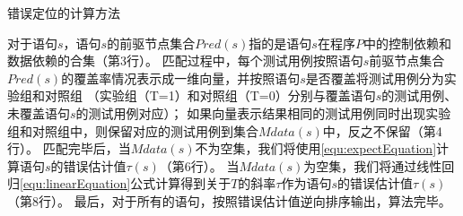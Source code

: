 \begin{algorithm}[hb]
	
	
	\caption{错误定位的计算方法} 
	
	
	\label{alg:fault-localization}
	
	
	
	
\end{algorithm}


对于语句$s$，语句$s$的前驱节点集合$Pred(s)$指的是语句$s$在程序$P$中的控制依赖和数据依赖的合集（第3行）。
匹配过程中，每个测试用例按照语句$s$前驱节点集合$Pred(s)$的覆盖率情况表示成一维向量，并按照语句$s$是否覆盖将测试用例分为实验组和对照组
（实验组（T=1）和对照组（T=0）分别与覆盖语句$s$的测试用例、未覆盖语句$s$的测试用例对应）；
如果向量表示结果相同的测试用例同时出现实验组和对照组中，则保留对应的测试用例到集合$Mdata(s)$中，反之不保留（第4行）。
匹配完毕后，当$Mdata(s)$不为空集，我们将使用\autoref{equ:expectEquation}计算语句$s$的错误估计值$\tau(s)$（第6行）。
当$Mdata(s)$为空集，我们将通过线性回归\autoref{equ:linearEquation}公式计算得到关于$T$的斜率$\tau$作为语句$s$的错误估计值$\tau(s)$（第8行）。
最后，对于所有的语句，按照错误估计值逆向排序输出，算法完毕。


